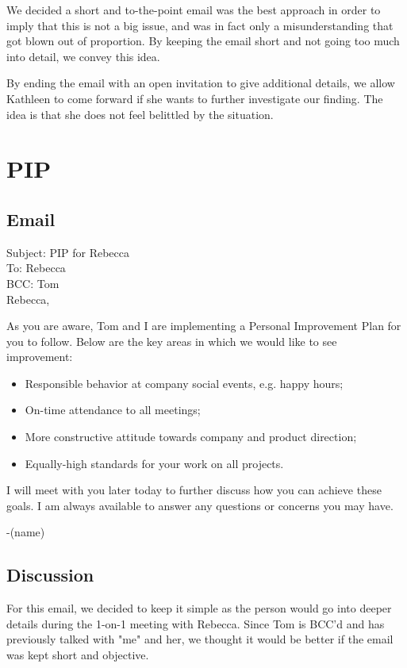 \documentclass[]{article}
\begin{document}
We decided a short and to-the-point email was the best approach in order to imply that this is not a big issue, and was in fact only a misunderstanding that got blown out of proportion. By keeping the email short and not going too much into detail, we convey this idea.

By ending the email with an open invitation to give additional details, we allow Kathleen to come forward if she wants to further investigate our finding. The idea is that she does not feel belittled by the situation.

\section*{PIP}
\subsection*{Email}
\noindent Subject: PIP for Rebecca \\
To: Rebecca \\
BCC: Tom \\
Rebecca,

As you are aware, Tom and I are implementing a Personal Improvement Plan for you to follow. Below are the key areas in which we would like to see improvement:

\begin{itemize}
\item Responsible behavior at company social events, e.g. happy hours;

\item On-time attendance to all meetings;

\item More constructive attitude towards company and product direction;

\item Equally-high standards for your work on all projects.
\end{itemize}

I will meet with you later today to further discuss how you can achieve these goals. I am always available to answer any questions or concerns you may have.

-(name)

\subsection*{Discussion}
For this email, we decided to keep it simple as the person would go into deeper details during the 1-on-1 meeting with Rebecca. Since Tom is BCC'd and has previously talked with "me" and her, we thought it would be better if the email was kept short and objective.
\end{document}
